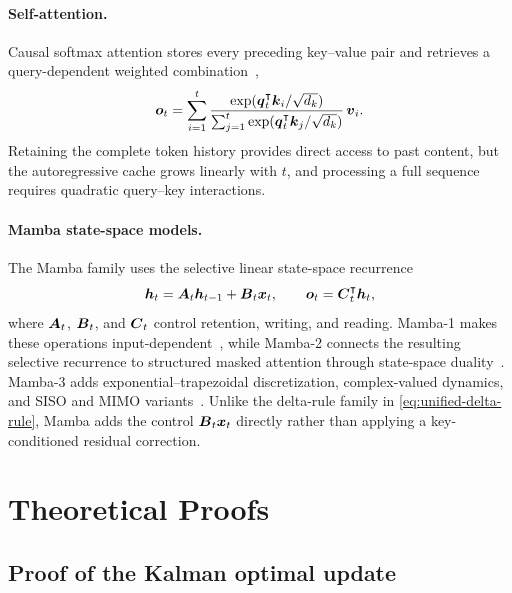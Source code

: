 \documentclass{article} %
\begin{document}
\paragraph{Self-attention.}
Causal softmax attention stores every preceding key--value pair and retrieves a query-dependent
weighted combination~\citep{vaswani2017attention},
\begin{equation}
  \boldsymbol{o}_t
  =\sum_{i=1}^{t}
    \frac{\exp(\boldsymbol{q}_t^{\intercal}\boldsymbol{k}_i/\sqrt{d_k})}
    {\sum_{j=1}^{t}\exp(\boldsymbol{q}_t^{\intercal}\boldsymbol{k}_j/\sqrt{d_k})}\,\boldsymbol{v}_i.
  \label{eq:softmax-attention}
\end{equation}
Retaining the complete token history provides direct access to past content, but the autoregressive
cache grows linearly with $t$, and processing a full sequence requires quadratic query--key
interactions.

\paragraph{Mamba state-space models.}
The Mamba family uses the selective linear state-space recurrence
\begin{equation}
  \boldsymbol{h}_t=\boldsymbol{A}_t\boldsymbol{h}_{t-1}+\boldsymbol{B}_t\boldsymbol{x}_t,
  \qquad
  \boldsymbol{o}_t=\boldsymbol{C}_t^{\intercal}\boldsymbol{h}_t,
  \label{eq:mamba-ssm}
\end{equation}
where $\boldsymbol{A}_t$, $\boldsymbol{B}_t$, and $\boldsymbol{C}_t$ control retention, writing, and reading. Mamba-1 makes
these operations input-dependent~\citep{gu2023mamba}, while Mamba-2 connects the resulting
selective recurrence to structured masked attention through state-space
duality~\citep{dao2024transformers}. Mamba-3 adds exponential--trapezoidal discretization,
complex-valued dynamics, and SISO and MIMO variants~\citep{lahoti2026mamba3}. Unlike the delta-rule
family in \eqref{eq:unified-delta-rule}, Mamba adds the control $\boldsymbol{B}_t\boldsymbol{x}_t$ directly rather
than applying a key-conditioned residual correction.

\section{Theoretical Proofs}
\label{app:proofs}

\subsection{Proof of the Kalman optimal update}
\label{app:proof-kalman-optimal-update}
\end{document}
